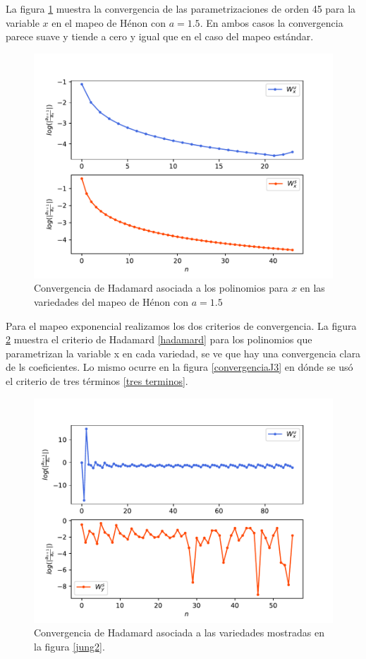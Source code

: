La figura \ref{convergenciaHenon1} muestra la convergencia de las parametrizaciones de orden 45 para la variable $x$ en el mapeo de Hénon con $a=1.5$. En ambos casos la convergencia parece suave y tiende a cero y igual que en el caso del mapeo estándar.

\begin{figure}[H]
\centering
\includegraphics[scale=0.5]{converHenon1}
\caption{Convergencia de Hadamard asociada a los polinomios para $x$ en las variedades del mapeo de Hénon con $a=1.5$}
\label{convergenciaHenon1}
\end{figure}


Para el mapeo exponencial realizamos los dos criterios de convergencia. La figura \ref{convergenciaJH} muestra el criterio de Hadamard \ref{hadamard} para los polinomios que parametrizan la variable x en cada variedad, se ve que hay una convergencia clara de ls coeficientes. Lo mismo ocurre en la figura \ref{convergenciaJ3} en dónde se usó el criterio de tres términos \ref{tres terminos}.

\begin{figure}[H]
\centering
\includegraphics[scale=0.5]{convergenciaJungH57}
\caption{Convergencia de Hadamard asociada a las variedades mostradas en la figura \ref{jung2}.}
\label{convergenciaJH}
\end{figure}


